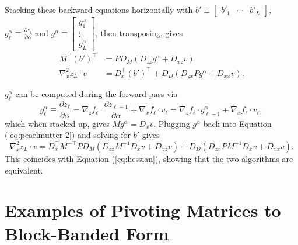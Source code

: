 \documentclass{article}
\begin{document}
Stacking these backward equations horizontally with $b'\equiv\left[
    \begin{smallmatrix}
      b'_1 & \cdots & b'_L
    \end{smallmatrix}
    \right]$,
$g^\alpha_\ell \equiv \frac{\partial z_\ell}{\partial \alpha}$ and $g^\alpha\equiv\left[
    \begin{smallmatrix}
      g^\alpha_1 \\ \vdots \\ g^\alpha_L
    \end{smallmatrix}
    \right]$, then transposing, gives
\begin{align}
  \label{eq:pearlmutter-2}
  M^\top \left(b'\right)^\top & = P D_M  \left(D_{zz} g^\alpha + D_{xz} v\right) \nonumber                       \\
  \nabla_x^2 z_L \cdot v      & = D_x^\top \left(b'\right)^\top + D_D \left(D_{zx} P g^\alpha + D_{xx} v\right).
\end{align}

$g^\alpha_\ell$ can be computed during the forward pass via
\begin{equation}
  g^\alpha_\ell \equiv \frac{\partial z_\ell}{\partial \alpha}
  = \nabla_z f_\ell \cdot \frac{\partial z_{\ell-1}}{\partial \alpha} + \nabla_x f_\ell \cdot v_\ell
  = \nabla_z f_\ell \cdot g^\alpha_{\ell-1} + \nabla_x f_\ell \cdot v_\ell,
\end{equation}
which when stacked up, gives $M g^\alpha = D_x v$.  Plugging $g^\alpha$ back
into Equation (\ref{eq:pearlmutter-2}) and solving for $b'$ gives
\begin{equation}
  \nabla_x^2 z_L \cdot v = D_x^\top M^{-\top} P D_M  \left(D_{zz} M^{-1} D_x v + D_{xz} v\right) +  D_D \left(D_{zx} P M^{-1} D_x v + D_{xx} v\right).
\end{equation}
This coincides with Equation (\ref{eq:hessian}), showing that the two algorithms are equivalent.

\section{Examples of Pivoting Matrices to Block-Banded Form}
\label{sec:pivoting-examples}
\end{document}
